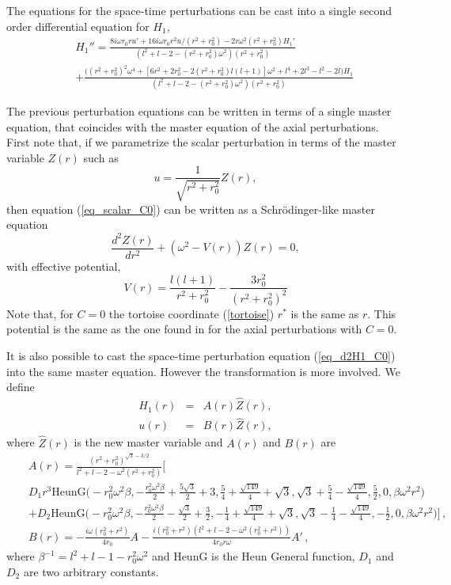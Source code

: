 \documentclass[a4paper,12pt]{article}
\def \nn {\nonumber}
\newcommand{\be}{\begin{equation}}
\newcommand{\ee}{\end{equation}}
\newcommand{\bea}{\begin{eqnarray}}
\newcommand{\eea}{\end{eqnarray}}
\begin{document}
The equations for the space-time perturbations can be cast into a single second order differential equation for $H_1$,
     \bea   
     &&H_1'' = \frac{8i\omega r_0 r u' + 16i\omega r_0 r^2 u /(r^2+r_0^2)-2r\omega^2\left(r^2+r_0^2\right)H_1'}{\left(l^2+l-2-\left(r^2+r_0^2\right)\omega^2\right)\left(r^2+r_0^2\right)} \nn \\
     &&+ \frac{\Big(\left(r^2+r_0^2\right)^2\omega^4+\left[6r^2+2r_0^2-2\left(r^2+r_0^2\right)l\left(l+1\right)\right]\omega^2+l^4+2l^3-l^2-2l\Big)H_1}{\left(l^2+l-2-\left(r^2+r_0^2\right)\omega^2\right)\left(r^2+r_0^2\right)} 
%  
%  
    \label{eq_d2H1_C0}
     \eea
% 


The previous perturbation equations can be written in terms of a single master equation, that coincides with the master equation of the axial perturbations. First note that, if we parametrize the scalar perturbation in terms of the master variable $Z(r)$ such as
   \be   
   u=\frac{1}{\sqrt{r^2+r_0^2}} Z(r),
   \ee   
then equation (\ref{eq_scalar_C0}) can be written as a
Schr\"odinger-like master equation  
   \be   
   \frac{d^2Z(r)}{dr^2}+\left(\omega^2-V(r)\right)Z(r)=0,
\label{eq_Schr}
   \ee 
with effective potential, 
    \be  
    V(r)=\frac{l\left(l+1\right)}{r^2+r_0^2}-\frac{3r_0^2}{(r^2+r_0^2)^2}
    \ee 
Note that, for $C=0$ the tortoise coordinate (\ref{tortoise}) $r^*$ is the same as $r$. 
This potential is the same as the one found in \cite{Blazquez-Salcedo:2018ipc} for the axial perturbations with $C=0$.

It is also possible to cast the space-time perturbation equation (\ref{eq_d2H1_C0}) into the same master equation. However the transformation is more involved. We define
     \bea   
    H_1(r)&=&A(r)\hat Z(r),\\
    u(r)&=&B(r)\hat Z(r),
    \eea   
where $\hat Z(r)$ is the new master variable and $A(r)$ and $B(r)$ are 
\bea
&& A(r) = \frac{(r^2+r_0^2)^{\sqrt{3}-3/2}}{l^2+l-2-\omega^2(r^2+r_0^2)}  \Big[  \\
%
&& D_1 r^3 
\textrm{HeunG}\Big(
-r_0^2\omega^2\beta,
-\frac{r_0^2\omega^2\beta}{2}+\frac{5\sqrt{3}}{2}+3,
\frac{5}{4}+\frac{\sqrt{149}}{4}+\sqrt{3},
%
\sqrt{3}+\frac{5}{4}-\frac{\sqrt{149}}{4},
\frac{5}{2},
0,
\beta\omega^2r^2
\Big) \nn \\
&& +D_2 
\textrm{HeunG}\Big(
-r_0^2\omega^2\beta,
-\frac{r_0^2\omega^2\beta}{2}-\frac{\sqrt{3}}{2}+\frac{3}{2},
-\frac{1}{4}+\frac{\sqrt{149}}{4}+\sqrt{3},
%
\sqrt{3}-\frac{1}{4}-\frac{\sqrt{149}}{4},
-\frac{1}{2},
0,
\beta\omega^2r^2
\Big)
\Big] \, , \nn \\
&& B(r) = -\frac{i\omega(r_0^2+r^2)}{4r_0}A - \frac{i(r_0^2+r^2)(l^2+l-2-\omega^2(r_0^2+r^2))}{4r_0r\omega}A' \, ,
\eea
where $\beta^{-1}=l^2+l-1-r_0^2\omega^2$ and $\textrm{HeunG}$ is the Heun General function, $D_1$ and $D_2$ are two arbitrary constants.
\end{document}
